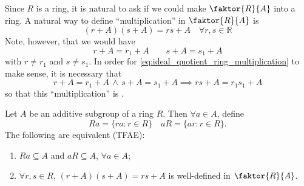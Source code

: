 Since $R$ is a ring, it is natural to ask if we could make $\faktor{R}{A}$ into a ring. A natural way to define ``multiplication'' in $\faktor{R}{A}$ is
\begin{equation}\tag{$\dagger$}\label{eq:ideal_quotient_ring_multiplication}
  (r + A)(s + A) = rs + A \quad \forall r, s \in \mathbb{R}
\end{equation}
Note, however, that we would have
\begin{equation*}
  r + A = r_1 + A \qquad s + A = s_1 + A
\end{equation*}
with $r \neq r_1$ and $s \neq s_1$. In order for \cref{eq:ideal_quotient_ring_multiplication} to make sense, it is necessary that
\begin{equation*}
  r + A = r_1 + A \, \land \, s + A = s_1 + A \implies rs + A = r_1 s_1 + A
\end{equation*}
so that this ``multiplication'' is .

\begin{propo}
\label{propo:equivalent_defn_of_a_well_defined_coset_multiplication}
  Let $A$ be an additive subgroup of a ring $R$. Then $\forall a \in A$, define
  \begin{equation*}
    Ra = \{ ra : r \in R \} \quad aR = \{ ar : r \in R \}.
  \end{equation*}
  The following are equivalent (TFAE):
  \begin{enumerate}
    \item $Ra \subseteq A$ and $aR \subseteq A$, $\forall a \in A$;
    \item $\forall r, s \in R$, $(r + A)(s + A) = rs + A$ is well-defined in $\faktor{R}{A}$.
  \end{enumerate}
\end{propo}

